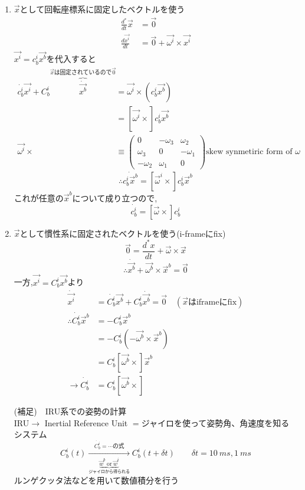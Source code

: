 \documentclass[class=article, crop=false, preview=false, dvipdfmx, a4paper]{standalone}
\begin{document}
\begin{enumerate}[label = \maru{\theenumi}]
\item $\vec{x}$として回転座標系に固定したベクトルを使う
\begin{align}
\frac{d^*}{dt}\vec{x} & = \vec{0} \\
\frac{d\vec{x^i} }{dt}& = \vec{0}+ \vec{\omega^i}\times \vec{x^i} 
\end{align}
$\vec{x^i}  = c^i_b \vec{x^b}$を代入すると
\begin{align*}
\dot{c^i_b} \vec{x^i} + C^i_b \overbrace{\dot{\vec{x^b}}}^
{\vec{x}\text{は固定されているので}\vec{0}}
	& =\vec{\omega^i} \times (c^i_b \vec{x^b}) \\
	& = [\vec{\omega^i} \times] c^i_b \vec{x^b} \\
   \vec{\omega^i} \times
	& \equiv
    \begin{pmatrix}
      0 & -\omega_3 & \omega_2 \\
      \omega_3 & 0 & -\omega_1 \\ 
      -\omega_2 & \omega_1 & 0
    \end{pmatrix}
    \text{skew synmetiric form of }\omega
\end{align*}
\begin{equation}
\therefore \dot{c^i_b\vec x^b} = [\vec \omega^i \times]c^i_b \vec x^b
\end{equation}
これが任意の$\vec x^b$について成り立つので,
\begin{equation}
\dot{c^i_b} = [\vec \omega \times] c^i_b
\end{equation}

\item $\vec{x}$として慣性系に固定されたベクトルを使う(i-frameにfix)
\[ \vec{0} = \frac{d^*x}{dt} + \vec{\omega} \times \vec{x} \]
\[\therefore \dot{\vec{x^b}} + \vec{\omega^b} \times \vec{x}^b = \vec{0} \]
一方,$\vec{x^i}=C^i_b\vec{x^b}$より
\begin{align}
\dot{\vec{x^i}}&=\dot{C^i_b}\vec{x^b}+C^i_b\dot{\vec{x^b}}
=\vec{0} \quad \left(\vec{x}\text{はiframeにfix}\right)\\
\therefore \dot{C^i_b}\vec{x}^b&=-C^i_b\vec{x}^b\\
&=-C^i_b\left(- \vec{\omega^b} \times \vec{x}^b\right)\\
&=C^i_b[\vec{\omega^b} \times] \vec{x}^b\\
\rightarrow \dot{C^i_b}&=C^i_b[\vec{\omega^b}\times]
\end{align}

(補足)　IRU系での姿勢の計算\\
IRU$\rightarrow$
Inertial Reference Unit
$=$ジャイロを使って姿勢角、角速度を知るシステム
\[
C^i_b\left(t\right)
\xrightarrow[\underbrace{\vec{w}^b \ \text{or} \ \vec{w}^i }_{\text{ジャイロから得られる}}]{\dot{C^i_b} = \cdots \text{の式}}
C^i_b \left( t + \delta t \right)
\quad\quad
\delta t = \SI{10}{ms}, \SI{1}{ms}
\]
ルンゲクッタ法などを用いて数値積分を行う
\end{enumerate}
\end{document}

